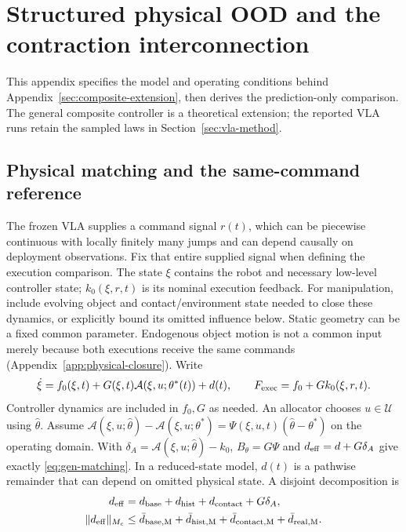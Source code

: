 \section{Structured physical OOD and the contraction interconnection}
\label{sec:gen-theory}
This appendix specifies the model and operating conditions behind
Appendix~\ref{sec:composite-extension}, then derives the prediction-only comparison.
The general composite controller is a theoretical extension; the reported
VLA runs retain the sampled laws in Section~\ref{sec:vla-method}.

\subsection{Physical matching and the same-command reference}
The frozen VLA supplies a command signal $r(t)$, which can be
piecewise continuous with locally finitely many jumps and can depend
causally on deployment observations.
Fix that entire supplied signal when defining the execution comparison.
The state $\xi$ contains the robot and necessary low-level controller
state; $k_0(\xi,r,t)$ is its nominal execution feedback. For manipulation,
include evolving object and contact/environment state needed to close these
dynamics, or explicitly bound its omitted influence below. Static geometry
can be a fixed common parameter. Endogenous object motion is not a common
input merely because both executions receive the same commands
(Appendix~\ref{app:physical-closure}). Write
\begin{equation}
 \dot\xi=f_0(\xi,t)+G(\xi,t)\mathcal A(\xi,u;\theta^*(t))+d(t),
 \qquad F_{\rm exec}=f_0+Gk_0(\xi,r,t).
 \label{eq:gen-plant}
\end{equation}
Controller dynamics are included in $f_0,G$ as needed. An allocator
chooses $u\in\mathcal U$ using $\hat\theta$. Assume
$\mathcal A(\xi,u;\hat\theta)-\mathcal A(\xi,u;\theta^*)=
\Psi(\xi,u,t)(\hat\theta-\theta^*)$ on the operating domain.
With $\delta_A=\mathcal A(\xi,u;\hat\theta)-k_0$,
$B_\theta=G\Psi$ and $d_{\rm eff}=d+G\delta_A$ give exactly
\eqref{eq:gen-matching}. In a reduced-state model, $d(t)$ is a pathwise remainder that can depend
on omitted physical state. A disjoint decomposition is
\[
\begin{aligned}
 d_{\rm eff}&=d_{\rm base}+d_{\rm hist}+d_{\rm contact}+G\delta_A,\\
 \|d_{\rm eff}\|_{M_c}&\le
 \bar d_{\rm base,M}+\bar d_{\rm hist,M}+
 \bar d_{\rm contact,M}+\bar d_{\rm real,M}.
\end{aligned}
\]
